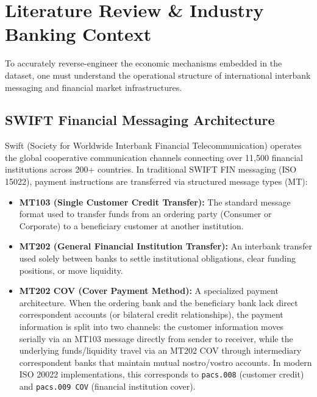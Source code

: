 \documentclass[11pt,a4paper]{article}
\begin{document}
\section{Literature Review \& Industry Banking Context}

To accurately reverse-engineer the economic mechanisms embedded in the dataset, one must understand the operational structure of international interbank messaging and financial market infrastructures.

\subsection{SWIFT Financial Messaging Architecture}
Swift (Society for Worldwide Interbank Financial Telecommunication) operates the global cooperative communication channels connecting over 11,500 financial institutions across 200+ countries. In traditional SWIFT FIN messaging (ISO 15022), payment instructions are transferred via structured message types (MT):
\begin{itemize}
    \item \textbf{MT103 (Single Customer Credit Transfer):} The standard message format used to transfer funds from an ordering party (Consumer or Corporate) to a beneficiary customer at another institution.
    \item \textbf{MT202 (General Financial Institution Transfer):} An interbank transfer used solely between banks to settle institutional obligations, clear funding positions, or move liquidity.
    \item \textbf{MT202 COV (Cover Payment Method):} A specialized payment architecture. When the ordering bank and the beneficiary bank lack direct correspondent accounts (or bilateral credit relationships), the payment information is split into two channels: the customer information moves serially via an MT103 message directly from sender to receiver, while the underlying funds/liquidity travel via an MT202 COV through intermediary correspondent banks that maintain mutual nostro/vostro accounts. In modern ISO 20022 implementations, this corresponds to \texttt{pacs.008} (customer credit) and \texttt{pacs.009 COV} (financial institution cover).
\end{itemize}
\end{document}

